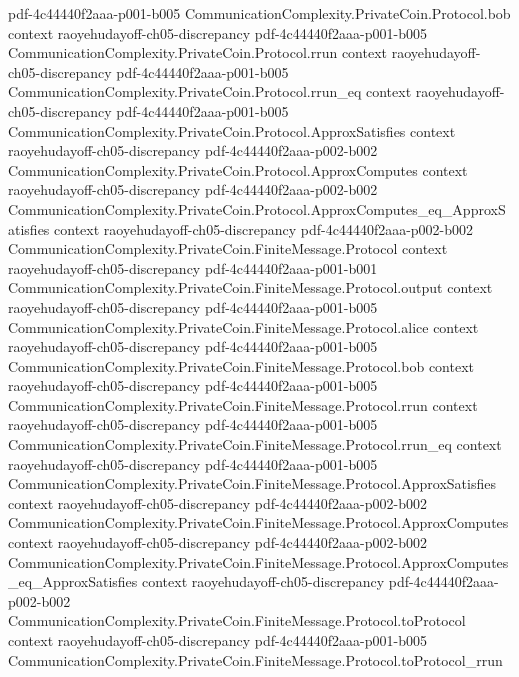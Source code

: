 \begin{lemma}
  {pdf-4c44440f2aaa-p001-b005}
\proofstep
  {CommunicationComplexity.PrivateCoin.Protocol.bob}
  {context}
  {raoyehudayoff-ch05-discrepancy}
  {pdf-4c44440f2aaa-p001-b005}
\proofstep
  {CommunicationComplexity.PrivateCoin.Protocol.rrun}
  {context}
  {raoyehudayoff-ch05-discrepancy}
  {pdf-4c44440f2aaa-p001-b005}
\proofstep
  {CommunicationComplexity.PrivateCoin.Protocol.rrun_eq}
  {context}
  {raoyehudayoff-ch05-discrepancy}
  {pdf-4c44440f2aaa-p001-b005}
\proofstep
  {CommunicationComplexity.PrivateCoin.Protocol.ApproxSatisfies}
  {context}
  {raoyehudayoff-ch05-discrepancy}
  {pdf-4c44440f2aaa-p002-b002}
\proofstep
  {CommunicationComplexity.PrivateCoin.Protocol.ApproxComputes}
  {context}
  {raoyehudayoff-ch05-discrepancy}
  {pdf-4c44440f2aaa-p002-b002}
\proofstep
  {CommunicationComplexity.PrivateCoin.Protocol.ApproxComputes_eq_ApproxSatisfies}
  {context}
  {raoyehudayoff-ch05-discrepancy}
  {pdf-4c44440f2aaa-p002-b002}
\proofstep
  {CommunicationComplexity.PrivateCoin.FiniteMessage.Protocol}
  {context}
  {raoyehudayoff-ch05-discrepancy}
  {pdf-4c44440f2aaa-p001-b001}
\proofstep
  {CommunicationComplexity.PrivateCoin.FiniteMessage.Protocol.output}
  {context}
  {raoyehudayoff-ch05-discrepancy}
  {pdf-4c44440f2aaa-p001-b005}
\proofstep
  {CommunicationComplexity.PrivateCoin.FiniteMessage.Protocol.alice}
  {context}
  {raoyehudayoff-ch05-discrepancy}
  {pdf-4c44440f2aaa-p001-b005}
\proofstep
  {CommunicationComplexity.PrivateCoin.FiniteMessage.Protocol.bob}
  {context}
  {raoyehudayoff-ch05-discrepancy}
  {pdf-4c44440f2aaa-p001-b005}
\proofstep
  {CommunicationComplexity.PrivateCoin.FiniteMessage.Protocol.rrun}
  {context}
  {raoyehudayoff-ch05-discrepancy}
  {pdf-4c44440f2aaa-p001-b005}
\proofstep
  {CommunicationComplexity.PrivateCoin.FiniteMessage.Protocol.rrun_eq}
  {context}
  {raoyehudayoff-ch05-discrepancy}
  {pdf-4c44440f2aaa-p001-b005}
\proofstep
  {CommunicationComplexity.PrivateCoin.FiniteMessage.Protocol.ApproxSatisfies}
  {context}
  {raoyehudayoff-ch05-discrepancy}
  {pdf-4c44440f2aaa-p002-b002}
\proofstep
  {CommunicationComplexity.PrivateCoin.FiniteMessage.Protocol.ApproxComputes}
  {context}
  {raoyehudayoff-ch05-discrepancy}
  {pdf-4c44440f2aaa-p002-b002}
\proofstep
  {CommunicationComplexity.PrivateCoin.FiniteMessage.Protocol.ApproxComputes_eq_ApproxSatisfies}
  {context}
  {raoyehudayoff-ch05-discrepancy}
  {pdf-4c44440f2aaa-p002-b002}
\proofstep
  {CommunicationComplexity.PrivateCoin.FiniteMessage.Protocol.toProtocol}
  {context}
  {raoyehudayoff-ch05-discrepancy}
  {pdf-4c44440f2aaa-p001-b005}
\proofstep
  {CommunicationComplexity.PrivateCoin.FiniteMessage.Protocol.toProtocol_rrun}

\end{lemma}

